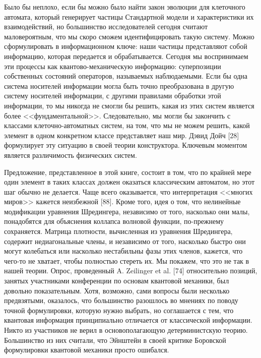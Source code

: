 \documentclass[main.tex]{subfiles}
\begin{document}
Было бы неплохо, если бы можно было найти закон эволюции для клеточного автомата, который генерирует частицы Стандартной модели и характеристики их взаимодействий, но большинство исследователей сегодня считают маловероятным, что мы скоро сможем идентифицировать такую систему. 
Можно сформулировать в информационном ключе: наши частицы представляют собой информацию, которая передается и обрабатывается. Сегодня мы воспринимаем эти процессы как квантово-механическую информацию: суперпозиции собственных состояний операторов, называемых наблюдаемыми. Если бы одна система носителей информации могла быть точно преобразована в другую систему носителей информации, с другими правилами обработки этой информации, то мы никогда не смогли бы решить, какая из этих систем является более <<фундаментальной>>. Следовательно, мы могли бы закончить с классами клеточно-автоматных систем, на том, что мы не можем решить, какой элемент в одном конкретном классе представляет наш мир. Дэвид Дойч [28] формулирует эту ситуацию в своей теории конструктора. Ключевым моментом является различимость физических систем. 

Предложение, представленное в этой книге, состоит в том, что по крайней мере один элемент в таких классах должен оказаться классическим автоматом, но этот шаг обычно не делается. Чаще всего оказывается, что интерпретация <<многих миров>> кажется неизбежной [88]. Кроме того, идея о том, что нелинейные модификации уравнения Шредингера, независимо от того, насколько они малы, понадобятся для объяснения коллапса волновой функции, по-прежнему сохраняется. Матрица плотности, вычисленная из уравнения Шредингера, содержит недиагональные члены, и независимо от того, насколько быстро они могут колебаться или насколько нестабильны фазы этих членов, кажется, что чего-то не хватает, чтобы полностью стереть их. 
Мы покажем, что это не так в нашей теории. Опрос, проведенный A. Zeilinger et al. [74] относительно позиций, занятых участниками конференции по основам квантовой механики, был довольно показательным. Хотя, возможно, сами вопросы были несколько предвзятыми, оказалось, что большинство разошлось во мнениях по поводу точной формулировки, которую нужно выбрать, но соглашается с тем, что квантовая информация принципиально отличается от классической информации. Никто из участников не верил в основополагающую детерминистскую теорию. Большинство из них считали, что Эйнштейн в своей критике Боровской формулировки квантовой механики просто ошибался. 
\end{document}
